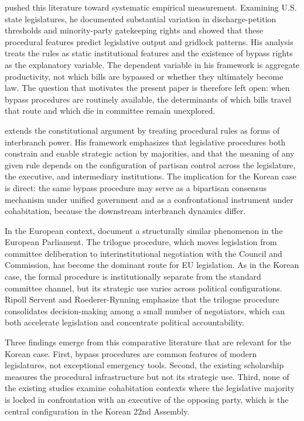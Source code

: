 \documentclass[11pt]{article}
\begin{document}
\citet{crosson2018} pushed this literature toward systematic empirical measurement. Examining U.S. state legislatures, he documented substantial variation in discharge-petition thresholds and minority-party gatekeeping rights and showed that these procedural features predict legislative output and gridlock patterns. His analysis treats the rules as static institutional features and the existence of bypass rights as the explanatory variable. The dependent variable in his framework is aggregate productivity, not which bills are bypassed or whether they ultimately become law. The question that motivates the present paper is therefore left open: when bypass procedures are routinely available, the determinants of which bills travel that route and which die in committee remain unexplored.

\citet{chafetz2019} extends the constitutional argument by treating procedural rules as forms of interbranch power. His framework emphasizes that legislative procedures both constrain and enable strategic action by majorities, and that the meaning of any given rule depends on the configuration of partisan control across the legislature, the executive, and intermediary institutions. The implication for the Korean case is direct: the same bypass procedure may serve as a bipartisan consensus mechanism under unified government and as a confrontational instrument under cohabitation, because the downstream interbranch dynamics differ.

In the European context, \citet{ripoll2018} document a structurally similar phenomenon in the European Parliament. The trilogue procedure, which moves legislation from committee deliberation to interinstitutional negotiation with the Council and Commission, has become the dominant route for EU legislation. As in the Korean case, the formal procedure is institutionally separate from the standard committee channel, but its strategic use varies across political configurations. Ripoll Servent and Roederer-Rynning emphasize that the trilogue procedure consolidates decision-making among a small number of negotiators, which can both accelerate legislation and concentrate political accountability.

Three findings emerge from this comparative literature that are relevant for the Korean case. First, bypass procedures are common features of modern legislatures, not exceptional emergency tools. Second, the existing scholarship measures the procedural infrastructure but not its strategic use. Third, none of the existing studies examine cohabitation contexts where the legislative majority is locked in confrontation with an executive of the opposing party, which is the central configuration in the Korean 22nd Assembly.
\end{document}
